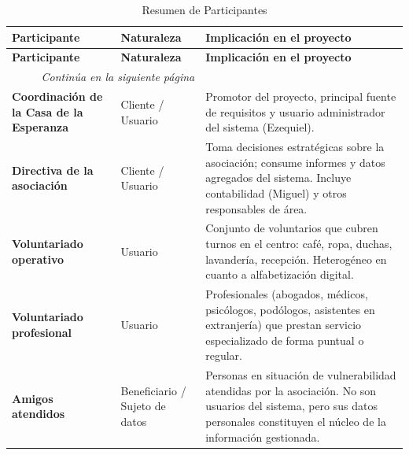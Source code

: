 \begin{longtable}[]{@{}
        p{}
        p{}
        p{}@{}}

    \caption{Resumen de Participantes} \\

    \toprule
    \textbf{Participante} & \textbf{Naturaleza} & \textbf{Implicación en el proyecto} \\
    \midrule
    \endfirsthead %

    \toprule
    \textbf{Participante} & \textbf{Naturaleza} & \textbf{Implicación en el proyecto} \\
    \midrule
    \endhead %

    \midrule
    \multicolumn{2}{r}{\small\emph{Continúa en la siguiente página}} \\
    \endfoot %

    \bottomrule
    \endlastfoot %

    \textbf{Coordinación de la Casa de la Esperanza} & Cliente / Usuario &
    Promotor del proyecto, principal fuente de requisitos y usuario
    administrador del sistema (Ezequiel). \\
    \midrule

    \textbf{Directiva de la asociación} & Cliente / Usuario & Toma
    decisiones estratégicas sobre la asociación; consume informes y datos
    agregados del sistema. Incluye contabilidad (Miguel) y otros
    responsables de área. \\
    \midrule

    \textbf{Voluntariado operativo} & Usuario & Conjunto de voluntarios que
    cubren turnos en el centro: café, ropa, duchas, lavandería, recepción.
    Heterogéneo en cuanto a alfabetización digital. \\
    \midrule

    \textbf{Voluntariado profesional} & Usuario & Profesionales (abogados,
    médicos, psicólogos, podólogos, asistentes en extranjería) que prestan
    servicio especializado de forma puntual o regular. \\
    \midrule

    \textbf{Amigos atendidos} & Beneficiario / Sujeto de datos & Personas en
    situación de vulnerabilidad atendidas por la asociación. No son usuarios
    del sistema, pero sus datos personales constituyen el núcleo de la
    información gestionada. \\
    \midrule


\end{longtable}

